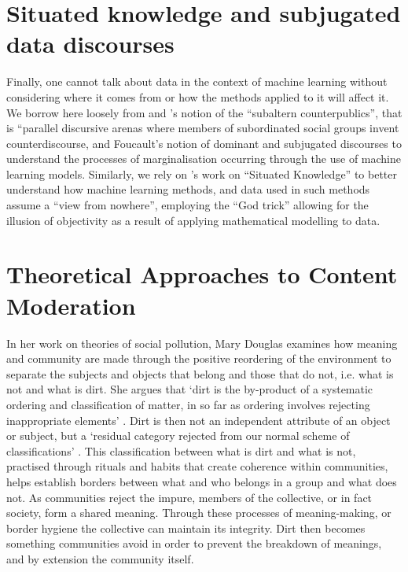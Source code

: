 {\color{red}
\section{Situated knowledge and subjugated data discourses} 
Finally, one cannot talk about data in the context of machine learning without considering where it comes from or how the methods applied to it will affect it. We borrow here loosely from \cite{Fraser:1989} and \cite{Spivak}'s notion of the ``subaltern counterpublics'', that is ``parallel discursive arenas where members of subordinated social groups invent counterdiscourse, and Foucault's notion of dominant and subjugated discourses to understand the processes of marginalisation occurring through the use of machine learning models. Similarly, we rely on \cite{Haraway:1988}'s work on ``Situated Knowledge'' to better understand how machine learning methods, and data used in such methods assume a ``view from nowhere'', employing the ``God trick'' allowing for the illusion of objectivity as a result of applying mathematical modelling to data.

\cite{Harway:1988,Gitelman:2013,Gitelman-Jackson:2013,Mohanty:1984}

\section{Theoretical Approaches to Content Moderation}

In her work on theories of social pollution, Mary Douglas \citeyear{Douglas:1966} examines how meaning and community are made through the positive reordering of the environment to separate the subjects and objects that belong and those that do not, i.e. what is not and what is dirt. She argues that `dirt is the by-product of a systematic ordering and classification of matter, in so far as ordering involves rejecting inappropriate elements' \cite{Douglas:1966}. Dirt is then not an independent attribute of an object or subject, but a `residual category rejected from our normal scheme of classifications' \cite{Douglas:1966}. This classification between what is dirt and what is not, practised through rituals and habits that create coherence within communities, helps establish borders between what and who belongs in a group and what does not. As communities reject the impure, members of the collective, or in fact society, form a shared meaning. Through these processes of meaning-making, or border hygiene the collective can maintain its integrity. Dirt then becomes something communities avoid in order to prevent the breakdown of meanings, and by extension the community itself.

}
